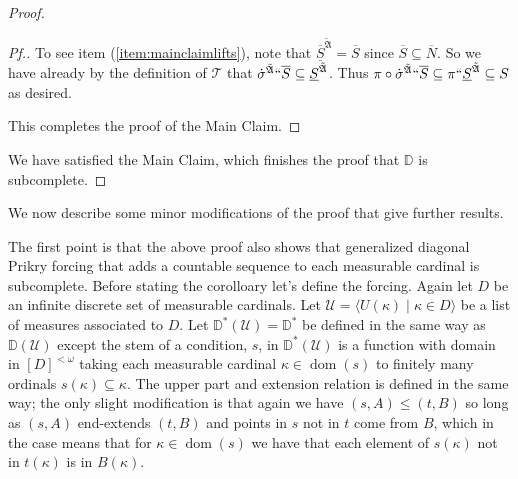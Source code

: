 \documentclass{amsart}
\theoremstyle{definition}
\theoremstyle{remark}
\newcommand{\D}{\mathbb{D}}
\newcommand{\U}{\mathcal{U}}
\DeclareMathOperator{\ran}{range}
\DeclareMathOperator{\dom}{dom}
\newcommand{\st}{\; | \;}
\newcommand{\seq}[2]{\langle #1 \st #2 \rangle}
\newcommand{\SH}{\mathcal{H}\textit{ull} \,}
\newcommand{\sk}[3]{\SH^{#1}( {#2} \cup {\ran(#3)} ) }
\newcommand{\Sk}[3]{\SH^{#1}( {#2} \cup {#3} ) }
\begin{document}
\begin{proof}
\begin{proof}[Pf.]

To see item (\ref{item:mainclaimlifts}), note that $\overline{\underline S}^{\tilde{\mathfrak A}} = \overline S$ since $\overline S \subseteq \overline N$. So we have already by the definition of $\mathcal T$  that $\dot{\sigma}^{\tilde{\mathfrak A}}``\overline S \subseteq \underline S^{\tilde{\mathfrak A}}$. Thus $\pi \circ \dot{\sigma}^{\tilde{\mathfrak A}}``\overline S \subseteq \pi `` \underline S^{\tilde{\mathfrak A}} \subseteq S$ as desired. %

This completes the proof of the Main Claim.
\end{proof}
We have satisfied the Main Claim, which finishes the proof that $\D$ is subcomplete.
\end{proof}

We now describe some minor modifications of the proof that give further results.

The first point is that the above proof also shows that generalized diagonal Prikry forcing that adds a countable sequence to each measurable cardinal is subcomplete. Before stating the corolloary let's define the forcing. Again let $D$ be an infinite discrete set of measurable cardinals. Let $\U = \seq{ U(\kappa) }{ \kappa \in D }$ be a list of measures associated to $D$. 
Let $\D^*(\U) = \D^*$ be defined in the same way as $\D(\U)$ except the stem of a condition, $s$, in $\D^*(\U)$ is a function with domain in $[D]^{<\omega}$ taking each measurable cardinal $\kappa \in \dom(s)$ to finitely many ordinals $s(\kappa) \subseteq \kappa$. The upper part and extension relation is defined in the same way; the only slight modification is that again we have $(s, A) \leq (t, B)$ so long as $(s, A)$ end-extends $(t, B)$ and points in $s$ not in $t$ come from $B$, which in the case means that for $\kappa \in \dom(s)$ we have that each element of $s(\kappa)$ not in $t(\kappa)$ is in $B(\kappa)$. 
\end{document}
